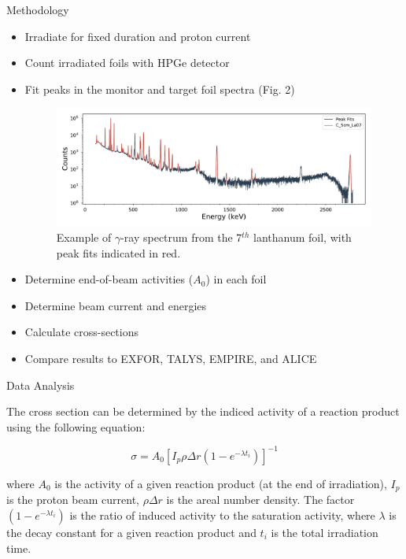 \documentclass[final]{beamer}
\newlength{\onecolwid}
\begin{document}
\begin{frame}[t]
\begin{columns}[t]
\begin{column}{\onecolwid}
\begin{block}{Methodology}
{\begin{itemize}
\item Irradiate for fixed duration and proton current
\item Count irradiated foils with HPGe detector
\item Fit peaks in the monitor and target foil spectra (Fig. 2)

\begin{figure}
\includegraphics[width=0.9\linewidth]{peak_fits/C_5cm_La07_fits.pdf}
\caption{\hspace*{15pt}Example of $\gamma$-ray spectrum from the 7$^{th}$ lanthanum foil, with peak fits indicated in red.}
\end{figure}


\item Determine end-of-beam activities ($A_0$) in each foil
\item Determine beam current and energies
\item Calculate cross-sections
\item Compare results to EXFOR, TALYS, EMPIRE, and ALICE
\end{itemize}

}



\begin{block}{Data Analysis}
\small{\hspace*{50pt}The cross section can be determined by the indiced activity of a reaction product using the following equation:

\begin{equation}
\sigma =  A_0[I_p \rho \Delta r (1-e^{-\lambda t_i})]^{-1}
\label{eq:xs_calc}
\end{equation}

where $A_0$ is the activity of a given reaction product (at the end of irradiation), $I_p$ is the proton beam current, $\rho \Delta r$ is the areal number density. The factor $(1-e^{-\lambda t_i})$ is the ratio of induced activity to the saturation activity, where $\lambda$ is the decay constant for a given reaction product and $t_i$ is the total irradiation time. 

}
\end{block}
\end{block}
\end{column}
\end{columns}
\end{frame}
\end{document}
